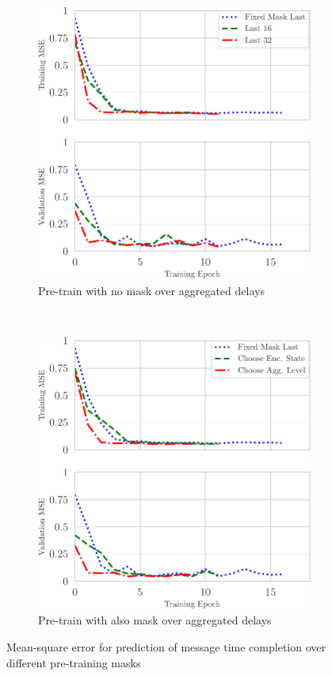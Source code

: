 \begin{figure}[h]
    \centering
    \begin{subfigure}[h]{0.5\textwidth}
        \centering
        \includegraphics[scale=0.71]{figures/finetune_mct_loss_comparison.pdf}
        \caption{Pre-train with no mask over aggregated delays}
    \end{subfigure}%
    ~ 
    \begin{subfigure}[h]{0.5\textwidth}
        \centering
        \includegraphics[scale=0.71]{figures/finetune_mct_loss_comparison_agg.pdf}
        \caption{Pre-train with also mask over aggregated delays}
    \end{subfigure}
    \caption{Mean-square error for prediction of message
time completion over different pre-training masks}
    \label{fig:mct_mask}
\end{figure}

